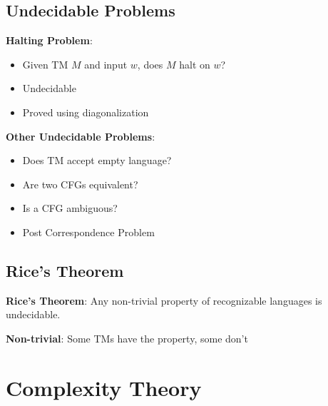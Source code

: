 \documentclass[12pt,a4paper]{report}
\begin{document}
\subsection{Undecidable Problems}
\begin{concept}
\textbf{Halting Problem}:
\begin{itemize}
    \item Given TM $M$ and input $w$, does $M$ halt on $w$?
    \item Undecidable
    \item Proved using diagonalization
\end{itemize}

\textbf{Other Undecidable Problems}:
\begin{itemize}
    \item Does TM accept empty language?
    \item Are two CFGs equivalent?
    \item Is a CFG ambiguous?
    \item Post Correspondence Problem
\end{itemize}
\end{concept}

\subsection{Rice's Theorem}
\begin{theorem}
\textbf{Rice's Theorem}: Any non-trivial property of recognizable languages is undecidable.

\textbf{Non-trivial}: Some TMs have the property, some don't
\end{theorem}

\section{Complexity Theory}
\end{document}
